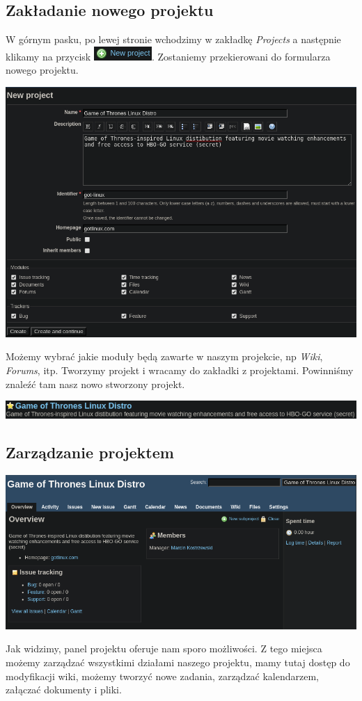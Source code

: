 \documentclass{article}
\begin{document}
\subsection{Zakładanie nowego projektu}
W górnym pasku, po lewej stronie wchodzimy w zakładkę \textit{Projects}
a następnie klikamy na przycisk \includegraphics[]{newproject.png}.
Zostaniemy przekierowani do formularza nowego projektu.
\begin{center}
    \includegraphics[scale=0.4]{projectform.png}
\end{center} 
Możemy wybrać jakie moduły będą zawarte w naszym projekcie, np \textit{Wiki}, \textit{Forums}, itp.
\newline
Tworzymy projekt i wracamy do zakładki z projektami. Powinniśmy znaleźć
tam nasz nowo stworzony projekt.
\begin{center}
    \includegraphics[scale=0.5]{myproject.png}
\end{center}

\subsection{Zarządzanie projektem}
\begin{center}
    \includegraphics[scale=0.5]{dashboard.png}
\end{center}
Jak widzimy, panel projektu oferuje nam sporo możliwości.
Z tego miejsca możemy zarządzać wszystkimi działami naszego projektu,
mamy tutaj dostęp do modyfikacji wiki, możemy tworzyć nowe zadania,
zarządzać kalendarzem, załączać dokumenty i pliki.
\end{document}
